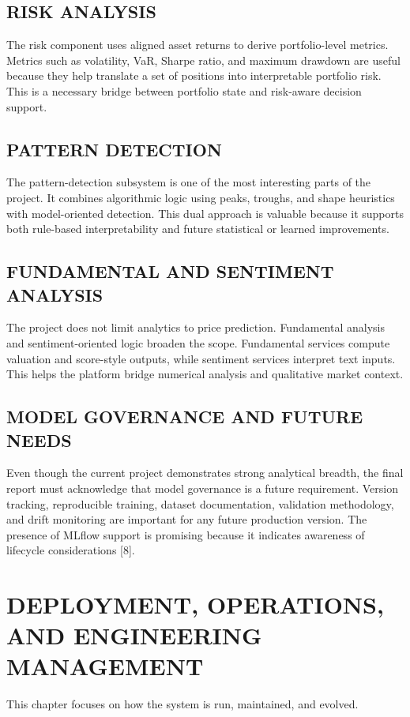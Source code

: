 \documentclass[12pt,a4paper]{report}
\begin{document}
\section{RISK ANALYSIS}
The risk component uses aligned asset returns to derive portfolio-level metrics. Metrics such as volatility, VaR, Sharpe ratio, and maximum drawdown are useful because they help translate a set of positions into interpretable portfolio risk. This is a necessary bridge between portfolio state and risk-aware decision support.

\section{PATTERN DETECTION}
The pattern-detection subsystem is one of the most interesting parts of the project. It combines algorithmic logic using peaks, troughs, and shape heuristics with model-oriented detection. This dual approach is valuable because it supports both rule-based interpretability and future statistical or learned improvements.

\section{FUNDAMENTAL AND SENTIMENT ANALYSIS}
The project does not limit analytics to price prediction. Fundamental analysis and sentiment-oriented logic broaden the scope. Fundamental services compute valuation and score-style outputs, while sentiment services interpret text inputs. This helps the platform bridge numerical analysis and qualitative market context.

\section{MODEL GOVERNANCE AND FUTURE NEEDS}
Even though the current project demonstrates strong analytical breadth, the final report must acknowledge that model governance is a future requirement. Version tracking, reproducible training, dataset documentation, validation methodology, and drift monitoring are important for any future production version. The presence of MLflow support is promising because it indicates awareness of lifecycle considerations [8].

\chapter{DEPLOYMENT, OPERATIONS, AND ENGINEERING MANAGEMENT}
This chapter focuses on how the system is run, maintained, and evolved.
\end{document}
